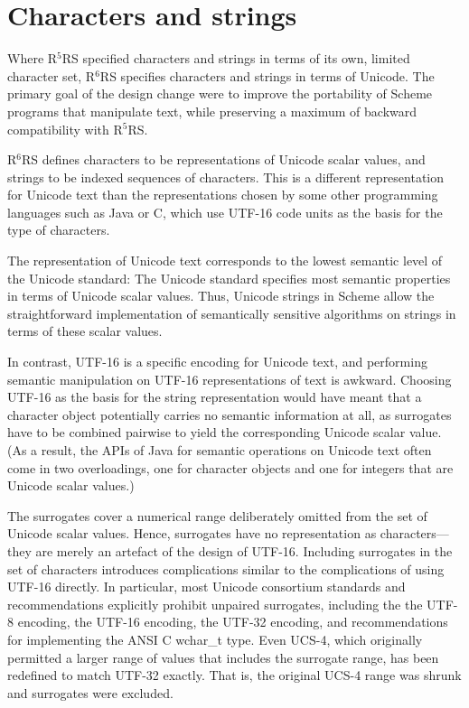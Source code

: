 \documentclass[twoside,twocolumn]{algol60}
\newcommand{\rn}[1]{R$^{#1}$RS}
\begin{document}
\section{Characters and strings}

Where \rn{5} specified characters and strings in terms of its own,
limited character set, \rn{6} specifies characters and strings in
terms of Unicode.  The primary goal of the design change were to
improve the portability of Scheme programs that manipulate text, while
preserving a maximum of backward compatibility with \rn{5}.

\rn{6} defines characters to be representations of Unicode scalar
values, and strings to be indexed sequences of characters.  This is a
different representation for Unicode text than the representations
chosen by some other programming languages such as Java or
C\sharpsign{}, which use UTF-16 code units as the basis for the type
of characters.

The representation of Unicode text corresponds to the lowest semantic
level of the Unicode standard: The Unicode standard specifies most
semantic properties in terms of Unicode scalar values.  Thus, Unicode
strings in Scheme allow the straightforward implementation of
semantically sensitive algorithms on strings in terms of these scalar
values.

In contrast, UTF-16 is a specific encoding for Unicode text, and
performing semantic manipulation on UTF-16 representations of text is
awkward.  Choosing UTF-16 as the basis for the string representation
would have meant that a character object potentially carries no
semantic information at all, as surrogates have to be combined
pairwise to yield the corresponding Unicode scalar value.  (As a
result, the APIs of Java for semantic operations on Unicode text often
come in two overloadings, one for character objects and one for
integers that are Unicode scalar values.)

The surrogates cover a numerical range deliberately omitted from the
set of Unicode scalar values.  Hence, surrogates have no
representation as characters---they are merely an artefact of the
design of UTF-16.  Including surrogates in the set of characters
introduces complications similar to the complications of using UTF-16
directly.  In particular, most Unicode consortium standards and
recommendations explicitly prohibit unpaired surrogates, including the
the UTF-8 encoding, the UTF-16 encoding, the UTF-32 encoding, and
recommendations for implementing the ANSI C {\cf wchar\_t} type.  Even
UCS-4, which originally permitted a larger range of values that
includes the surrogate range, has been redefined to match UTF-32
exactly. That is, the original UCS-4 range was shrunk and surrogates
were excluded.
\end{document}
